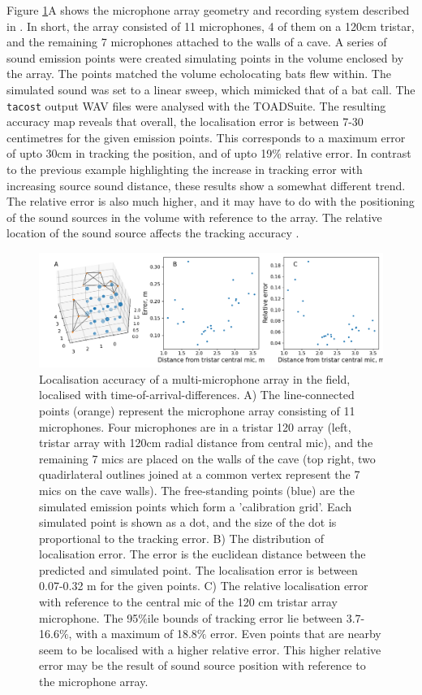 \documentclass[
]{book}
\begin{document}
Figure \ref{tacostfig2}A shows the microphone array geometry and recording system described in \citep{Batstone2019}. In short, the array consisted of 11 microphones, 4 of them on a 120cm tristar, and the remaining 7 microphones attached to the walls of a cave. A series of sound emission points were created simulating points in the volume enclosed by the array. The points matched the volume echolocating bats flew within. The simulated sound was set to a linear sweep, which mimicked that of a bat call. The \texttt{tacost} output WAV files were analysed with the TOADSuite. The resulting accuracy map reveals that overall, the localisation error is between 7-30 centimetres for the given emission points. This corresponds to a maximum error of upto 30cm in tracking the position, and of upto 19\(\%\) relative error. In contrast to the previous example highlighting the increase in tracking error with increasing source sound distance, these results show a somewhat different trend. The relative error is also much higher, and it may have to do with the positioning of the sound sources in the volume with reference to the array. The relative location of the sound source affects the tracking accuracy \citep{aubauer1996acoustical}.

\begin{figure}
\includegraphics[width=1.0\columnwidth]{original_papers/tacost/data_for_figures/analysis/fig2_points_and_error.png}
\centering
\caption{Localisation accuracy of a multi-microphone array in the field, localised with time-of-arrival-differences. A) The line-connected points (orange) represent the microphone array consisting of 11 microphones. Four microphones are in a tristar 120 array (left, tristar array with 120cm radial distance from central mic), and 
the remaining 7 mics are placed on the walls of the cave (top right, two quadirlateral outlines joined at a common vertex represent the 7 mics on the cave walls). The free-standing points (blue) are  the simulated emission points which form a 'calibration grid'. Each simulated point is shown as a dot, and the size of the dot is proportional to the tracking error. B) The distribution of localisation error. The error is 
the euclidean distance between the predicted and simulated point. The localisation error is between 0.07-0.32 m for the given points. C) The relative localisation error with reference to the central mic of the 120 cm tristar array microphone. The 95$\%$ile bounds of tracking error lie between 3.7-16.6$\%$, with a maximum of 18.8$\%$ error. Even points that are nearby seem to be localised with a higher relative error. This higher relative error may be the result of sound source position with reference to the microphone array.}
\label{tacostfig2}
\end{figure}
\end{document}
